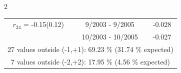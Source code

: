\begin{multicols}{2}
{\begin{tabular}{ccc}
    $r_{24}$ = -0.15(0.12) &       9/2003 -  9/2005 &       -0.028    \vspace{-.10in} \\ 
  &       10/2003 - 10/2005 &       -0.027  \vspace{-.02in}   \\ \hline 
  \multicolumn{3}{c}{              27 values outside (-1,+1): 69.23  \% (31.74  \% expected)}\vspace{-.10in} \\ 
\multicolumn{3}{c}{               7 values outside (-2,+2): 17.95 \%  (4.56 \% expected) } \\
 \end{tabular} \\ 
 } 
\end{multicols} 
